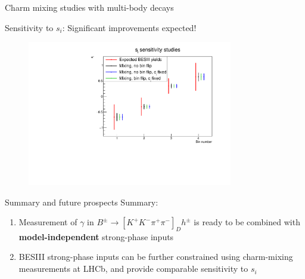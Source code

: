\documentclass[xcolor={dvipsnames}]{beamer}
\begin{document}
\begin{frame}{Charm mixing studies with multi-body decays}
  \begin{center}
    {\large Sensitivity to $s_i$: Significant improvements expected!}
  \end{center}
  \begin{figure}[htb]
    \centering
    \includegraphics[width=0.8\textwidth]{Plots/si_sensitivity.pdf}
  \end{figure}
\end{frame}

\begin{frame}{Summary and future prospects}
  \vspace{0.3cm}
  {\Large Summary:}
  \vspace{0.5cm}
  \begin{enumerate}
    \setlength\itemsep{1.5em}
    \item{Measurement of $\gamma$ in $B^\pm\to[K^+K^-\pi^+\pi^-]_Dh^\pm$ is ready to be combined with \textbf{model-independent} strong-phase inputs}
    \item{BESIII strong-phase inputs can be further constrained using charm-mixing measurements at LHCb, and provide comparable sensitivity to $s_i$}
  \end{enumerate}
\end{frame}
\end{document}
